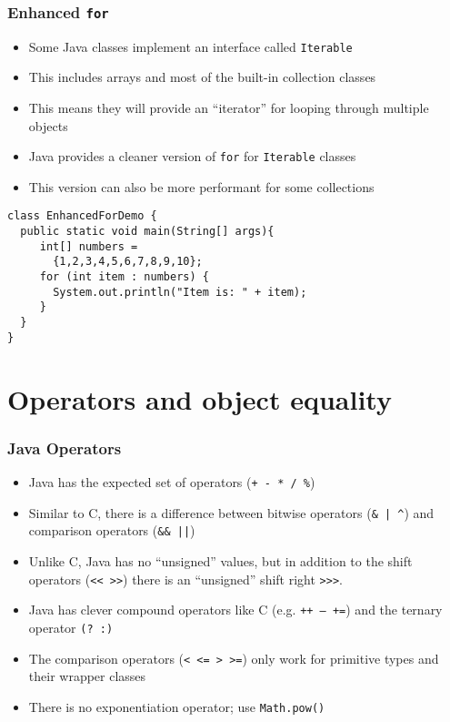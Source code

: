 \documentclass{beamer}
\begin{document}
\begin{frame}[fragile]
\frametitle{Enhanced \texttt{for}}
\begin{itemize}
\item Some Java classes implement an interface called \texttt{Iterable}
\item This includes arrays and most of the built-in collection classes
\item This means they will provide an ``iterator'' for looping through multiple objects
\item Java provides a cleaner version of \texttt{for} for \texttt{Iterable} classes
\item This version can also be more performant for some collections
\end{itemize}
\lstset{language=Java}
\begin{lstlisting}
class EnhancedForDemo {
  public static void main(String[] args){
     int[] numbers = 
       {1,2,3,4,5,6,7,8,9,10};
     for (int item : numbers) {
       System.out.println("Item is: " + item);
     }
  }
}
\end{lstlisting}
\end{frame}

\section{Operators and object equality}
\begin{frame}
\frametitle{Java Operators}
\begin{itemize}
\item Java has the expected set of operators (\texttt{+ - * / \%})
\item Similar to C, there is a difference between bitwise operators (\texttt{\& | \^}) and comparison operators (\texttt{\&\& ||})
\item Unlike C, Java has no ``unsigned'' values, but in addition to the shift operators (\texttt{<< >>}) there is an ``unsigned'' shift right \texttt{>>>}.
\item Java has clever compound operators like C (e.g. \texttt{++ -- +=}) and the ternary operator \texttt{(? :)}
\item The comparison operators (\texttt{< <= > >=}) only work for primitive types and their wrapper classes
\item There is no exponentiation operator; use \texttt{Math.pow()}
\end{itemize}
\end{frame}
\end{document}
